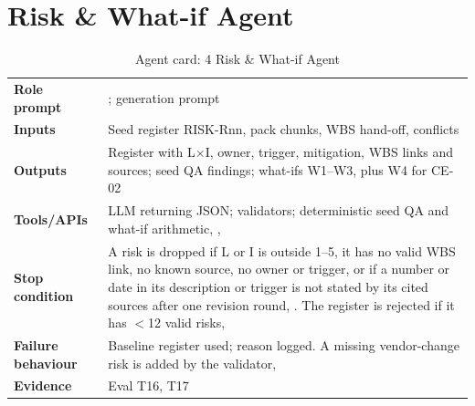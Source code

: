 \section{Risk \& What-if Agent}
\begin{table}[H]
\centering\footnotesize
\caption{Agent card: 4 Risk \& What-if Agent}
\label{tab:card-risk}
\begin{tabularx}{\textwidth}{>{\raggedright\arraybackslash}p{2.9cm}L}
\toprule
\textbf{Role prompt} & ; generation prompt  \\
\textbf{Inputs} & Seed register RISK-Rnn, pack chunks, WBS hand-off, conflicts \\
\textbf{Outputs} & Register with L$\times$I, owner, trigger, mitigation, WBS links and sources; seed QA findings; what-ifs W1--W3, plus W4 for CE-02 \\
\textbf{Tools/APIs} & LLM returning JSON; validators; deterministic seed QA and what-if arithmetic, ,  \\
\textbf{Stop condition} & A risk is dropped if L or I is outside 1--5, it has no valid WBS link, no known source, no owner or trigger, or if a number or date in its description or trigger is not stated by its cited sources after one revision round, . The register is rejected if it has $<$12 valid risks,  \\
\textbf{Failure behaviour} & Baseline register used; reason logged. A missing vendor-change risk is added by the validator,  \\
\textbf{Evidence} & Eval T16, T17 \\
\bottomrule
\end{tabularx}
\end{table}

